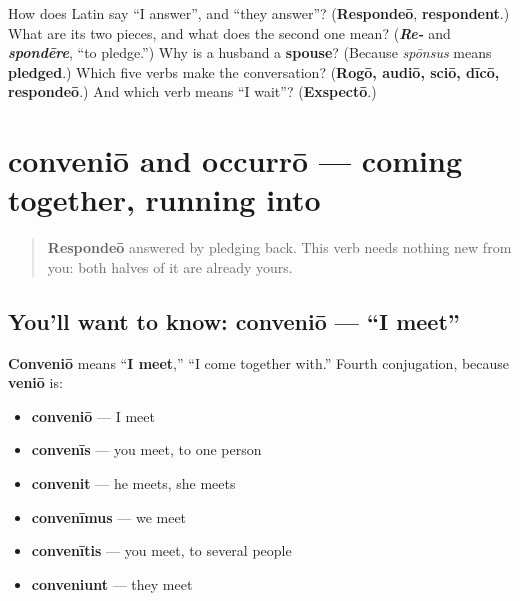 \begin{tcolorbox}[breakable,colback=teal!4,colframe=teal!35!black,title={Before you move on}]
How does Latin say \textquotedblleft{}I answer\textquotedblright{}, and \textquotedblleft{}they answer\textquotedblright{}? (\textbf{Respondeō}, \textbf{respondent}.) What are its two pieces, and what does the second one mean? (\emph{\textbf{Re-}} and \emph{\textbf{spondēre}}, \textquotedblleft{}to pledge.\textquotedblright{}) Why is a husband a \textbf{spouse}? (Because \emph{spōnsus} means \textbf{pledged}.) Which five verbs make the conversation? (\textbf{Rogō, audiō, sciō, dīcō, respondeō}.) And which verb means \textquotedblleft{}I wait\textquotedblright{}? (\textbf{Exspectō}.)
\end{tcolorbox}
\section[conveniō, occurrō]{conveniō and occurrō — coming together, running into}

\label{lesson:LA-C43-convenio}



\begin{quote}
\textbf{Respondeō} answered by pledging back. This verb needs nothing new from you: both halves of it are already yours.
\end{quote}

\subsection*{You'll want to know: conveniō — \textquotedblleft{}I meet\textquotedblright{}}
\textbf{Conveniō} means \textquotedblleft{}\textbf{I meet},\textquotedblright{} \textquotedblleft{}I come together with.\textquotedblright{} Fourth conjugation, because \textbf{veniō} is:

\begin{itemize}
\raggedright
  \item \textbf{conveniō} — I meet
  \item \textbf{convenīs} — you meet, to one person
  \item \textbf{convenit} — he meets, she meets
  \item \textbf{convenīmus} — we meet
  \item \textbf{convenītis} — you meet, to several people
  \item \textbf{conveniunt} — they meet
\end{itemize}


